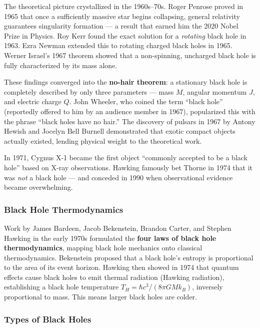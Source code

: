 \documentclass[11pt,letterpaper]{article}
\begin{document}
The theoretical picture crystallized in the 1960s--70s. Roger Penrose proved in 1965 that once a sufficiently massive star begins collapsing, general relativity guarantees singularity formation --- a result that earned him the 2020 Nobel Prize in Physics. Roy Kerr found the exact solution for a \textit{rotating} black hole in 1963. Ezra Newman extended this to rotating charged black holes in 1965. Werner Israel's 1967 theorem showed that a non-spinning, uncharged black hole is fully characterized by its mass alone.

These findings converged into the \textbf{no-hair theorem}: a stationary black hole is completely described by only three parameters --- mass $M$, angular momentum $J$, and electric charge $Q$. John Wheeler, who coined the term ``black hole'' (reportedly offered to him by an audience member in 1967), popularized this with the phrase ``black holes have no hair.'' The discovery of pulsars in 1967 by Antony Hewish and Jocelyn Bell Burnell demonstrated that exotic compact objects actually existed, lending physical weight to the theoretical work.

In 1971, Cygnus X-1 became the first object ``commonly accepted to be a black hole'' based on X-ray observations. Hawking famously bet Thorne in 1974 that it was \textit{not} a black hole --- and conceded in 1990 when observational evidence became overwhelming.

\subsubsection{Black Hole Thermodynamics}

Work by James Bardeen, Jacob Bekenstein, Brandon Carter, and Stephen Hawking in the early 1970s formulated the \textbf{four laws of black hole thermodynamics}, mapping black hole mechanics onto classical thermodynamics. Bekenstein proposed that a black hole's entropy is proportional to the area of its event horizon. Hawking then showed in 1974 that quantum effects cause black holes to emit thermal radiation (Hawking radiation), establishing a black hole temperature $T_H = \hbar c^3 / (8\pi G M k_B)$, inversely proportional to mass. This means larger black holes are colder.

\subsubsection{Types of Black Holes}
\end{document}
